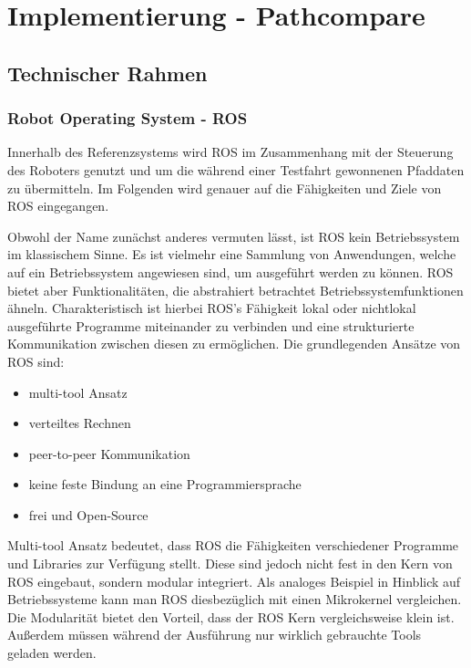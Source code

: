 \chapter{Implementierung - Pathcompare}
\label{sec:implementierung}
\section{Technischer Rahmen}

\subsection{Robot Operating System - ROS}

Innerhalb des Referenzsystems wird ROS im Zusammenhang mit der Steuerung
des Roboters genutzt und um die während einer Testfahrt gewonnenen Pfaddaten
zu übermitteln. Im Folgenden wird genauer auf die Fähigkeiten und
Ziele von ROS eingegangen.

Obwohl der Name zunächst anderes vermuten lässt, ist ROS kein
Betriebssystem im klassischem Sinne. Es ist vielmehr eine Sammlung von
Anwendungen, welche auf ein Betriebssystem angewiesen sind, um ausgeführt werden
zu können. ROS bietet aber Funktionalitäten, die abstrahiert betrachtet
Betriebssystemfunktionen ähneln. Charakteristisch ist hierbei ROS's Fähigkeit
lokal oder nichtlokal ausgeführte Programme miteinander zu verbinden und eine
strukturierte Kommunikation zwischen diesen zu ermöglichen. Die grundlegenden
Ansätze von ROS sind:

\begin{itemize}
  \item multi-tool Ansatz
  \item verteiltes Rechnen 
  \item peer-to-peer Kommunikation
  \item keine feste Bindung an eine Programmiersprache
  \item frei und Open-Source
\end{itemize}

Multi-tool Ansatz bedeutet, dass ROS die Fähigkeiten verschiedener Programme
und Libraries zur Verfügung stellt. Diese sind jedoch nicht fest in den Kern
von ROS eingebaut, sondern modular integriert. Als analoges Beispiel in
Hinblick auf Betriebssysteme kann man ROS diesbezüglich mit einen Mikrokernel
vergleichen. Die Modularität bietet den Vorteil, dass der ROS Kern
vergleichsweise klein ist. Außerdem müssen während der Ausführung nur wirklich
gebrauchte Tools geladen werden.

